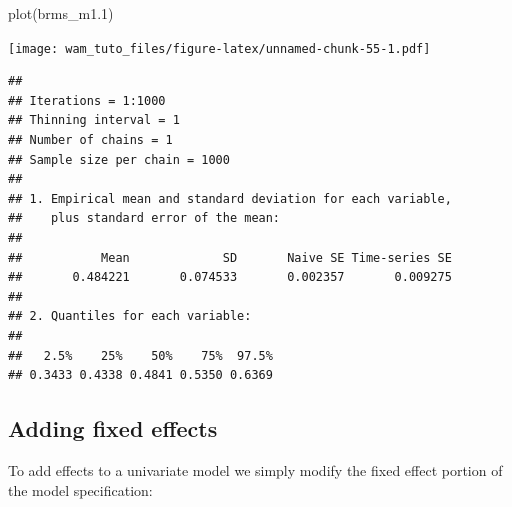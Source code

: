 \documentclass[
  12pt,
]{book}
\newenvironment{Shaded}{\begin{snugshade}}{\end{snugshade}}
\newcommand{\AttributeTok}[1]{\textcolor[rgb]{0.77,0.63,0.00}{#1}}
\newcommand{\ConstantTok}[1]{\textcolor[rgb]{0.00,0.00,0.00}{#1}}
\newcommand{\DecValTok}[1]{\textcolor[rgb]{0.00,0.00,0.81}{#1}}
\newcommand{\FloatTok}[1]{\textcolor[rgb]{0.00,0.00,0.81}{#1}}
\newcommand{\FunctionTok}[1]{\textcolor[rgb]{0.00,0.00,0.00}{#1}}
\newcommand{\NormalTok}[1]{#1}
\newcommand{\OtherTok}[1]{\textcolor[rgb]{0.56,0.35,0.01}{#1}}
\newcommand{\SpecialCharTok}[1]{\textcolor[rgb]{0.00,0.00,0.00}{#1}}
\begin{document}
\begin{Shaded}
\begin{Highlighting}[]
\FunctionTok{plot}\NormalTok{(brms\_m1}\FloatTok{.1}\NormalTok{)}
\end{Highlighting}
\end{Shaded}

\texttt{[image: wam\_tuto\_files/figure-latex/unnamed-chunk-55-1.pdf]}

\begin{Shaded}
\end{Shaded}

\begin{verbatim}
## 
## Iterations = 1:1000
## Thinning interval = 1 
## Number of chains = 1 
## Sample size per chain = 1000 
## 
## 1. Empirical mean and standard deviation for each variable,
##    plus standard error of the mean:
## 
##           Mean             SD       Naive SE Time-series SE 
##       0.484221       0.074533       0.002357       0.009275 
## 
## 2. Quantiles for each variable:
## 
##   2.5%    25%    50%    75%  97.5% 
## 0.3433 0.4338 0.4841 0.5350 0.6369
\end{verbatim}

\hypertarget{adding-fixed-effects-2}{%
\subsection{Adding fixed effects}\label{adding-fixed-effects-2}}

To add effects to a univariate model we simply modify the fixed effect portion of the model specification:
\end{document}
